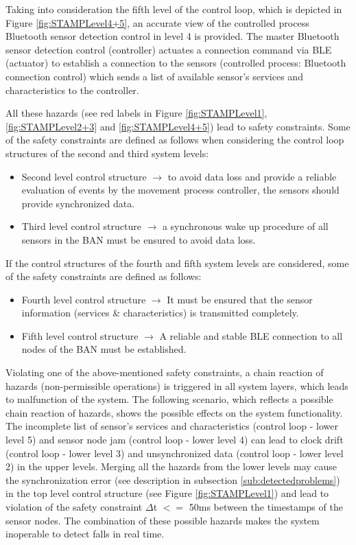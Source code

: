 \documentclass[10pt,journal,compsoc]{IEEEtran}
\begin{document}
	Taking into consideration the fifth level of the control loop, which is depicted in Figure \ref{fig:STAMPLevel4+5}, an accurate view of the controlled process Bluetooth sensor detection control in level 4 is provided. The master Bluetooth sensor detection control (controller) actuates a connection command via BLE (actuator) to establish a connection to the sensors (controlled process: Bluetooth connection control) which sends a list of available sensor's services and characteristics to the controller. 
	
	All these hazards (see red labels in Figure \ref{fig:STAMPLevel1}, \ref{fig:STAMPLevel2+3} and \ref{fig:STAMPLevel4+5}) lead to safety constraints.
	Some of the safety constraints are defined as follows when considering the control loop structures of the second and third system levels:
	\begin{itemize}
		\item Second level control structure $\rightarrow$ to avoid data loss and provide a reliable evaluation of events by the movement process controller, the sensors should provide synchronized data.
		\item Third level control structure $\rightarrow$ a synchronous wake up procedure of all sensors in the BAN must be ensured to avoid data loss.
	\end{itemize}
	If the control structures of the fourth and fifth system levels are considered, some of the safety constraints are defined as follows:
	\begin{itemize}
		\item Fourth level control structure $\rightarrow$ It must be ensured that the sensor information (services \& characteristics) is transmitted completely.
		\item Fifth level control structure $\rightarrow$ A reliable and stable BLE connection to all nodes of the BAN must be established.
	\end{itemize}
	Violating one of the above-mentioned safety constraints, a chain reaction of hazards (non-permissible operations) is triggered in all system layers, which leads to malfunction of the system.  The following scenario, which reflects a possible chain reaction of hazards, shows the possible effects on the system functionality.
	The incomplete list of sensor's services and characteristics (control loop - lower level 5) and sensor node jam (control loop - lower level 4) can lead to clock drift (control loop - lower level 3) and unsynchronized data (control loop - lower level 2) in the upper levels. Merging all the hazards from the lower levels may cause the synchronization error (see description in subsection \ref{sub:detectedproblems}) in the top level control structure (see Figure \ref{fig:STAMPLevel1}) and lead to violation of the safety constraint $\Delta$t $<=$ 50ms between the timestamps of the sensor nodes. The combination of these possible hazards makes the system inoperable to detect falls in real time.
	
\end{document}
